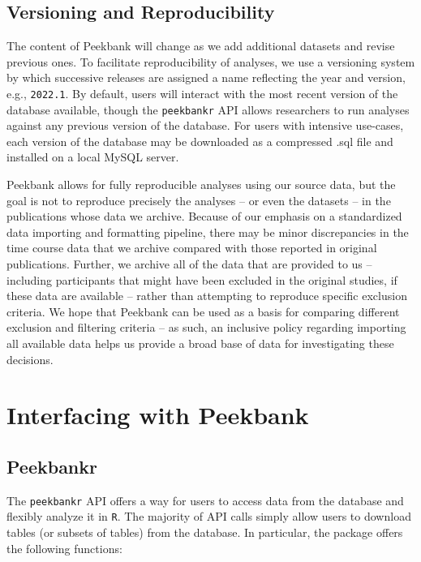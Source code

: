 \documentclass[
  english,
  man,floatsintext]{apa6}
\begin{document}
\hypertarget{versioning-and-reproducibility}{%
\subsection{Versioning and Reproducibility}\label{versioning-and-reproducibility}}

The content of Peekbank will change as we add additional datasets and revise previous ones.
To facilitate reproducibility of analyses, we use a versioning system by which successive releases are assigned a name reflecting the year and version, e.g., \texttt{2022.1}.
By default, users will interact with the most recent version of the database available, though the \texttt{peekbankr} API allows researchers to run analyses against any previous version of the database.
For users with intensive use-cases, each version of the database may be downloaded as a compressed .sql file and installed on a local MySQL server.

Peekbank allows for fully reproducible analyses using our source data, but the goal is not to reproduce precisely the analyses -- or even the datasets -- in the publications whose data we archive. Because of our emphasis on a standardized data importing and formatting pipeline, there may be minor discrepancies in the time course data that we archive compared with those reported in original publications. Further, we archive all of the data that are provided to us -- including participants that might have been excluded in the original studies, if these data are available -- rather than attempting to reproduce specific exclusion criteria. We hope that Peekbank can be used as a basis for comparing different exclusion and filtering criteria -- as such, an inclusive policy regarding importing all available data helps us provide a broad base of data for investigating these decisions.

\hypertarget{interfacing-with-peekbank}{%
\section{Interfacing with Peekbank}\label{interfacing-with-peekbank}}

\hypertarget{peekbankr}{%
\subsection{Peekbankr}\label{peekbankr}}

The \texttt{peekbankr} API offers a way for users to access data from the database and flexibly analyze it in \texttt{R}. The majority of API calls simply allow users to download tables (or subsets of tables) from the database. In particular, the package offers the following functions:
\end{document}
